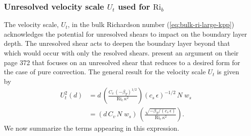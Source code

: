 \subsubsection{Unresolved velocity scale $U_{t}$ used for $\mbox{Ri}_{b}$}
\label{subsubsection:unresolved-shear}

The velocity scale, $U_{t}$, in the bulk Richardson number
(\ref{eq:bulk-ri-large-kpp}) acknowledges the potential for unresolved
shears to impact on the boundary layer depth.  The unresolved shear
acts to deepen the boundary layer beyond that which would occur with
only the resolved shears.  \cite{LargeKPP} present an argument on
their page 372 that focuses on an unresolved shear that reduces to a
desired form for the case of pure convection.  The general result for
the velocity scale $U_{t}$ is given by
\begin{subequations}
\begin{align}
 U_{t}^{2}(d) &= 
  d \, \left( \frac{C_{v} \,  (-\beta_{T})^{1/2}}{\mbox{Ri}_{c} \, \kappa^{2}} \right)
  (c_{s} \, \epsilon)^{-1/2} \, N \; w_{s}
 \\
 &= ( d \, C_{v} \, N \; w_{s} ) \, \left( \frac{ \sqrt{-\beta_{T} /  (c_{s} \, \epsilon) } }{ \, \mbox{Ri}_{c} \, \kappa^{2}} \right).
\label{eq:unresolved-shear-kpp}
\end{align}
\end{subequations}
We now summarize the terms appearing in this expression.
